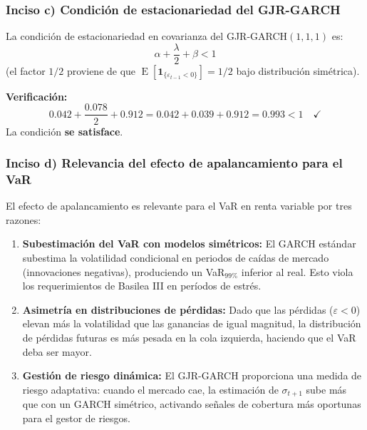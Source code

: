 \documentclass[12pt,a4paper]{article}
\DeclareMathOperator{\E}{E}
\begin{document}
\subsubsection*{Inciso c) Condición de estacionariedad del GJR-GARCH}

\begin{solucion}
La condición de estacionariedad en covarianza del GJR-GARCH$(1,1,1)$ es:
\begin{equation}
\alpha + \frac{\lambda}{2} + \beta < 1
\end{equation}
(el factor $1/2$ proviene de que $\E[\mathbf{1}_{\{\varepsilon_{t-1}<0\}}]=1/2$ bajo distribución simétrica).

\textbf{Verificación:}
\begin{equation}
0.042 + \frac{0.078}{2} + 0.912 = 0.042 + 0.039 + 0.912 = 0.993 < 1 \quad \checkmark
\end{equation}
La condición \textbf{se satisface}.
\end{solucion}

\subsubsection*{Inciso d) Relevancia del efecto de apalancamiento para el VaR}

\begin{solucion}
El efecto de apalancamiento es relevante para el VaR en renta variable por tres razones:

\begin{enumerate}[noitemsep]
  \item \textbf{Subestimación del VaR con modelos simétricos:} El GARCH estándar subestima la volatilidad condicional en periodos de caídas de mercado (innovaciones negativas), produciendo un VaR$_{99\%}$ inferior al real. Esto viola los requerimientos de Basilea III en períodos de estrés.
  \item \textbf{Asimetría en distribuciones de pérdidas:} Dado que las pérdidas ($\varepsilon<0$) elevan más la volatilidad que las ganancias de igual magnitud, la distribución de pérdidas futuras es más pesada en la cola izquierda, haciendo que el VaR deba ser mayor.
  \item \textbf{Gestión de riesgo dinámica:} El GJR-GARCH proporciona una medida de riesgo adaptativa: cuando el mercado cae, la estimación de $\sigma_{t+1}$ sube más que con un GARCH simétrico, activando señales de cobertura más oportunas para el gestor de riesgos.
\end{enumerate}
\end{solucion}
\end{document}
